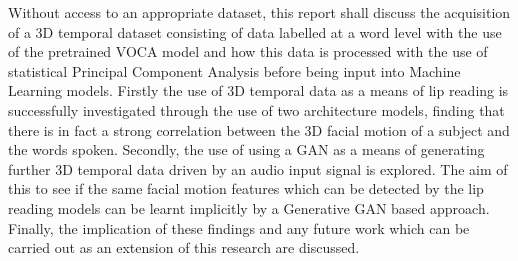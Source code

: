 Without access to an appropriate dataset, this report shall discuss the acquisition of a 3D temporal dataset consisting of data labelled at a word level with the use of the pretrained VOCA model \cite{Cudeiro2019} and how this data is processed with the use of statistical Principal Component Analysis before being input into Machine Learning models.
Firstly the use of 3D temporal data as a means of lip reading is successfully investigated through the use of two architecture models, finding that there is in fact a strong correlation between the 3D facial motion of a subject and the words spoken.
Secondly, the use of using a GAN as a means of generating further 3D temporal data driven by an audio input signal is explored.
The aim of this to see if the same facial motion features which can be detected by the lip reading models can be learnt implicitly by a Generative GAN based approach.
Finally, the implication of these findings and any future work which can be carried out as an extension of this research are discussed.